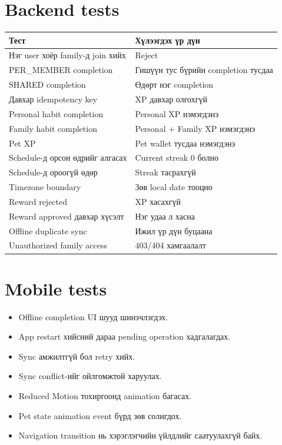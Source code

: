 \documentclass[12pt,a4paper,oneside]{report}
\begin{document}
\section{Backend tests}
\begin{longtable}{p{}p{}}
\toprule
\textbf{Тест} & \textbf{Хүлээгдэх үр дүн}\\
\midrule
Нэг user хоёр family-д join хийх & Reject\\
PER\_MEMBER completion & Гишүүн тус бүрийн completion тусдаа\\
SHARED completion & Өдөрт нэг completion\\
Давхар idempotency key & XP давхар олгохгүй\\
Personal habit completion & Personal XP нэмэгдэнэ\\
Family habit completion & Personal + Family XP нэмэгдэнэ\\
Pet XP & Pet wallet тусдаа нэмэгдэнэ\\
Schedule-д орсон өдрийг алгасах & Current streak 0 болно\\
Schedule-д ороогүй өдөр & Streak тасрахгүй\\
Timezone boundary & Зөв local date тооцно\\
Reward rejected & XP хасахгүй\\
Reward approved давхар хүсэлт & Нэг удаа л хасна\\
Offline duplicate sync & Ижил үр дүн буцаана\\
Unauthorized family access & 403/404 хамгаалалт\\
\bottomrule
\end{longtable}

\section{Mobile tests}
\begin{itemize}
  \item Offline completion UI шууд шинэчлэгдэх.
  \item App restart хийсний дараа pending operation хадгалагдах.
  \item Sync амжилтгүй бол retry хийх.
  \item Sync conflict-ийг ойлгомжтой харуулах.
  \item Reduced Motion тохиргоонд animation багасах.
  \item Pet state animation event бүрд зөв солигдох.
  \item Navigation transition нь хэрэглэгчийн үйлдлийг саатуулахгүй байх.
\end{itemize}
\end{document}
